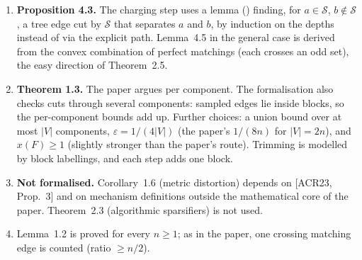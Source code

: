 \documentclass[10pt,a4paper]{article}
\newcommand{\lean}[1]{\textcolor{blue!50!black}{\texttt{\detokenize{#1}}}}
\begin{document}
\begin{enumerate}[leftmargin=*]
\item \textbf{Proposition 4.3.} The charging step uses a lemma (\lean{exists_cut_edge}) finding, for $a\in\mathcal S$, $b\notin\mathcal S$, a tree edge cut by $\mathcal S$ that separates $a$ and $b$, by induction on the depths instead of via the explicit path. Lemma~4.5 in the general case is derived from the convex combination of perfect matchings (each crosses an odd set), the easy direction of Theorem~2.5.
\item \textbf{Theorem 1.3.} The paper argues per component. The formalisation also checks cuts through several components: sampled edges lie inside blocks, so the per-component bounds add up. Further choices: a union bound over at most $|V|$ components, $\varepsilon=1/(4|V|)$ (the paper's $1/(8n)$ for $|V|=2n$), and $x(F)\ge1$ (slightly stronger than the paper's route). Trimming is modelled by block labellings, and each step adds one block.
\item \textbf{Not formalised.} Corollary~1.6 (metric distortion) depends on [ACR23, Prop.~3] and on mechanism definitions outside the mathematical core of the paper. Theorem~2.3 (algorithmic sparsifiers) is not used.
\item Lemma~1.2 is proved for every $n\ge1$; as in the paper, one crossing matching edge is counted (ratio $\ge n/2$).
\end{enumerate}
\end{document}
